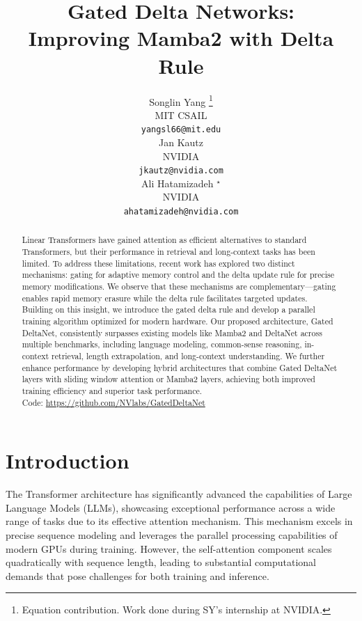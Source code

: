 \documentclass{article}
\title{Gated Delta Networks: \\
Improving Mamba2 with Delta Rule
}
\author{Songlin Yang \thanks{Equation contribution. Work done during SY's internship at NVIDIA.} \\
MIT CSAIL\\
\texttt{yangsl66@mit.edu} \\
\And
Jan Kautz \\
NVIDIA \\
\texttt{jkautz@nvidia.com} \\
\And
Ali Hatamizadeh $^\star$ \\
NVIDIA \\
\texttt{ahatamizadeh@nvidia.com} \\
}
\begin{document}
\maketitle

\begin{abstract}

Linear Transformers have gained attention as efficient alternatives to standard Transformers, but their performance in retrieval and long-context tasks has been limited.  To address these limitations, recent work has explored two distinct mechanisms: gating for adaptive memory control and the delta update rule for precise memory modifications. We observe that these mechanisms are complementary—gating enables rapid memory erasure while the delta rule facilitates targeted updates. Building on this insight, we introduce the gated delta rule and develop a parallel training algorithm optimized for modern hardware. Our proposed architecture, Gated DeltaNet, consistently surpasses existing models like Mamba2 and DeltaNet across multiple benchmarks, including language modeling, common-sense reasoning, in-context retrieval, length extrapolation, and long-context understanding. We further enhance performance by developing hybrid architectures that combine Gated DeltaNet layers with sliding window attention or Mamba2 layers, achieving both improved training efficiency and superior task performance. \\
Code:  \url{https://github.com/NVlabs/GatedDeltaNet}

\end{abstract}

\section{Introduction}

The Transformer architecture has significantly advanced the capabilities of Large Language Models (LLMs), showcasing exceptional performance across a wide range of tasks due to its effective attention mechanism. This mechanism excels in precise sequence modeling and leverages the parallel processing capabilities of modern GPUs during training. However, the self-attention component scales quadratically with sequence length, leading to substantial computational demands that pose challenges for both training and inference.
\end{document}
